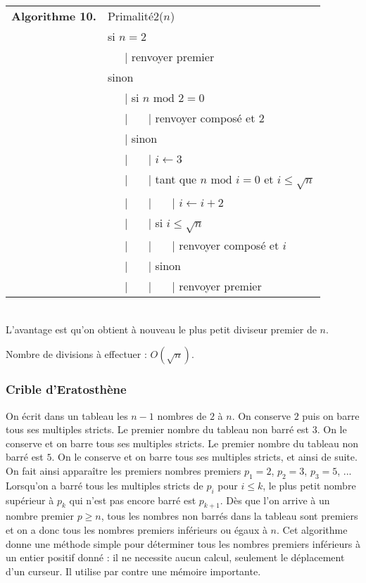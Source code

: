 \documentclass[12pt]{report}
\begin{document}
\begin{tabular}{ll}
\textbf{Algorithme 10.} & Primalité2($n$)\\
           & si $n=2$ \\
           & \ \ \ {\rm | } renvoyer premier  \\
           & sinon \\
           & \ \ \ {\rm | } si $n \text{ mod }2  =0 $ \\
           & \ \ \ {\rm |} \ \ \ {\rm |} renvoyer composé et 2 \\
           & \ \ \ {\rm |} sinon  \\
           & \ \ \ {\rm |} \ \ \ {\rm |}   $i \leftarrow 3$ \\
           & \ \ \ {\rm |} \ \ \ {\rm |} tant que $ n \text{ mod }  i =0$ et $i \leq \sqrt{n}$  \\
           & \ \ \ {\rm |} \ \ \ {\rm |} \ \ \ {\rm |}  $ i \leftarrow i+2$\\
           & \ \ \ {\rm |} \ \ \ {\rm |} si $i \leq \sqrt{n} $ \\
           & \ \ \ {\rm |} \ \ \ {\rm |} \ \ \ {\rm |} renvoyer composé et $i$ \\
           & \ \ \ {\rm |} \ \ \ {\rm |} sinon  \\
           & \ \ \ {\rm |} \ \ \ {\rm |} \ \ \ {\rm |}   renvoyer premier  
\end{tabular}\\

L'avantage est qu'on obtient à nouveau le plus petit diviseur premier de $n$. \par 
Nombre de divisions à effectuer : $O(\sqrt{n})$.

\subsubsection*{Crible d'Eratosthène}

 On écrit dans un tableau les $n-1$ nombres de $2$ à $n$. On conserve $2$ puis on barre tous ses multiples stricts. Le premier nombre du tableau
non barré est $3$. On le conserve et on barre tous ses multiples stricts. Le premier
nombre du tableau non barré est $5$. On le conserve et on barre tous ses multiples
stricts, et ainsi de suite. On fait ainsi apparaître les premiers nombres premiers
$p_1=2$, $p_2=3$, $p_3=5$, ...  Lorsqu’on a barré tous les multiples stricts de $p_i$ pour
$i\leq k$, le plus petit nombre supérieur à $p_k$ qui n’est pas encore barré est $p_{k+1}$.
Dès que l’on arrive à un nombre premier $p \geq n$, tous les nombres non barrés dans la tableau sont premiers et on a donc tous les nombres premiers inférieurs ou égaux à $n$.
Cet algorithme donne une méthode simple pour déterminer tous les nombres
premiers inférieurs à un entier positif donné : il ne necessite aucun calcul, seulement le déplacement d'un curseur.  Il utilise par contre une mémoire importante.
\end{document}
